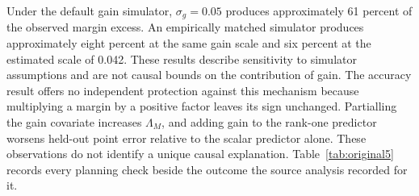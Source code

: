 Under the default gain simulator, $\sigma_g=0.05$ produces approximately 61 percent of the observed margin excess. An empirically matched simulator produces approximately eight percent at the same gain scale and six percent at the estimated scale of 0.042. These results describe sensitivity to simulator assumptions and are not causal bounds on the contribution of gain. The accuracy result offers no independent protection against this mechanism because multiplying a margin by a positive factor leaves its sign unchanged. Partialling the gain covariate increases $\Lambda_M$, and adding gain to the rank-one predictor worsens held-out point error relative to the scalar predictor alone. These observations do not identify a unique causal explanation. Table~\ref{tab:original5} records every planning check beside the outcome the source analysis recorded for it.

